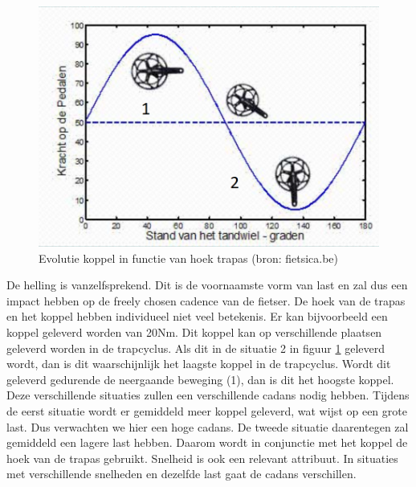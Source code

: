 \begin{figure}
  \centering
  \includegraphics[width=\linewidth]{images/trapcyclus.png}
  \caption{Evolutie koppel in functie van hoek trapas (bron: fietsica.be)}
  \label{fig:Evolutie koppel in functie van hoek trapas}
\end{figure}
\noindent De helling is vanzelfsprekend. Dit is de voornaamste vorm van last en zal dus een impact hebben op de freely chosen cadence van de fietser. De hoek van de trapas en het koppel hebben individueel niet veel betekenis. Er kan bijvoorbeeld een koppel geleverd worden van 20Nm. Dit koppel kan op verschillende plaatsen geleverd worden in de trapcyclus. Als dit in de situatie 2 in figuur \ref{fig:Evolutie koppel in functie van hoek trapas} geleverd wordt, dan is dit waarschijnlijk het laagste koppel in de trapcyclus. Wordt dit geleverd gedurende de neergaande beweging (1), dan is dit het hoogste koppel. Deze verschillende situaties zullen een verschillende cadans nodig hebben. Tijdens de eerst situatie wordt er gemiddeld meer koppel geleverd, wat wijst op een grote last. Dus verwachten we hier een hoge cadans. De tweede situatie daarentegen zal gemiddeld een lagere last hebben. Daarom wordt in conjunctie met het koppel de hoek van de trapas gebruikt. Snelheid is ook een relevant attribuut. In situaties met verschillende snelheden en dezelfde last gaat de cadans verschillen.
\newpage
